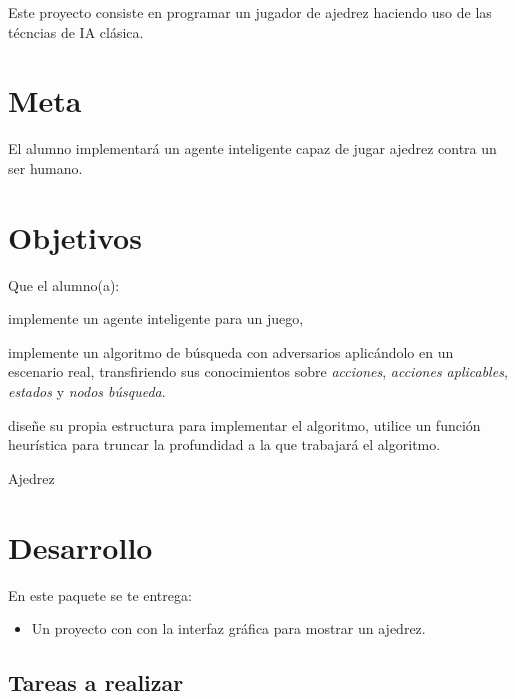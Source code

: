 
Este proyecto consiste en programar un jugador de ajedrez haciendo uso de las técncias de IA clásica.

\section{Meta}

El alumno implementará un agente inteligente capaz de jugar ajedrez contra un ser humano.

\section{Objetivos}

\begin{compactitem}
Que el alumno(a):
 \item implemente un agente inteligente para un juego,
 \item implemente un algoritmo de búsqueda con adversarios aplicándolo en un escenario real, transfiriendo sus conocimientos sobre \emph{acciones}, \emph{acciones aplicables}, \emph{estados} y \emph{nodos búsqueda}.
 \item diseñe su propia estructura para implementar el algoritmo,
 \itme utilice un función heurística para truncar la profundidad a la que trabajará el algoritmo.
\end{compactitem}


\begin{auxcode}
 \caption{Ajedrez}
 \centering
\end{auxcode}

\section{Desarrollo}

En este paquete se te entrega:
\begin{itemize}
 \item Un proyecto con  con la interfaz gráfica para mostrar un ajedrez.
\end{itemize}


\subsection{Tareas a realizar}

